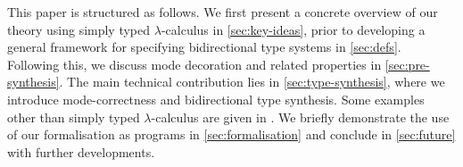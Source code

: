 This paper is structured as follows.
We first present a concrete overview of our theory using simply typed $\lambda$-calculus in \cref{sec:key-ideas}, prior to developing a general framework for specifying bidirectional type systems in \cref{sec:defs}.
Following this, we discuss mode decoration and related properties in \cref{sec:pre-synthesis}.
The main technical contribution lies in \cref{sec:type-synthesis}, where we introduce mode-correctness and bidirectional type synthesis.
Some examples other than simply typed $\lambda$-calculus are given in .
We briefly demonstrate the use of our \Agda formalisation as programs in \cref{sec:formalisation} and conclude in \cref{sec:future} with further developments.


